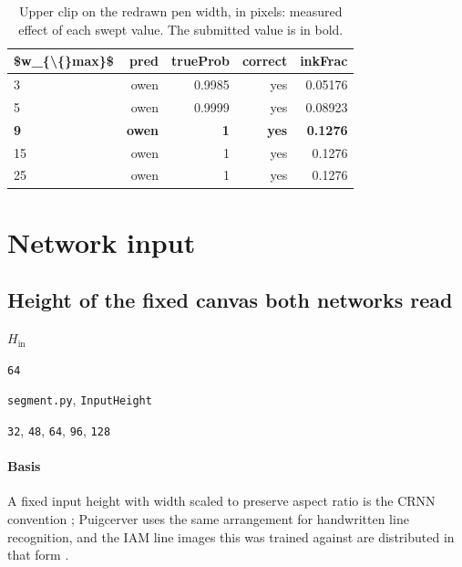 \begin{table}[htbp]
\centering
\small
\caption{Upper clip on the redrawn pen width, in pixels: measured effect of each swept value. The submitted value is in bold.}
\begin{tabular}{lrrrr}
\toprule
\$w\_\{\textbackslash\{\}max\}\$ & \textsf{pred} & \textsf{trueProb} & \textsf{correct} & \textsf{inkFrac} \\
\midrule
3 & owen & 0.9985 & yes & 0.05176 \\
5 & owen & 0.9999 & yes & 0.08923 \\
\bfseries 9 & \bfseries owen & \bfseries 1 & \bfseries yes & \bfseries 0.1276 \\
15 & owen & 1 & yes & 0.1276 \\
25 & owen & 1 & yes & 0.1276 \\
\bottomrule
\end{tabular}
\end{table}

\section{Network input}

\subsection{Height of the fixed canvas both networks read}

\label{coef:input-height}

\begin{description}[leftmargin=5.2em,style=sameline]

\item[Symbol] $H_{\text{in}}$

\item[Value] \texttt{64}

\item[Source] \texttt{segment.py}, \texttt{InputHeight}

\item[Swept] \texttt{32}, \texttt{48}, \texttt{64}, \texttt{96}, \texttt{128}

\end{description}

\paragraph{Basis}

A fixed input height with width scaled to preserve aspect ratio is the CRNN convention \cite[p.~2298]{shi2017}; Puigcerver \cite{puigcerver2017} uses the same arrangement for handwritten line recognition, and the IAM line images this was trained against are distributed in that form \cite{marti2002}.


